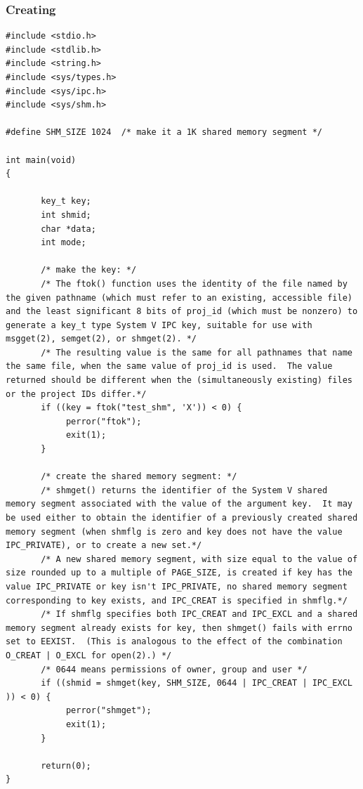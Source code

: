 \documentclass[12pt]{article}
\begin{document}
\subsubsection{Creating}
\begin{lstlisting}
#include <stdio.h>
#include <stdlib.h>
#include <string.h>
#include <sys/types.h>
#include <sys/ipc.h>
#include <sys/shm.h>

#define SHM_SIZE 1024  /* make it a 1K shared memory segment */

int main(void)
{

       key_t key;
       int shmid;
       char *data;
       int mode;

       /* make the key: */
       /* The ftok() function uses the identity of the file named by the given pathname (which must refer to an existing, accessible file) and the least significant 8 bits of proj_id (which must be nonzero) to generate a key_t type System V IPC key, suitable for use with msgget(2), semget(2), or shmget(2). */
       /* The resulting value is the same for all pathnames that name the same file, when the same value of proj_id is used.  The value returned should be different when the (simultaneously existing) files or the project IDs differ.*/
       if ((key = ftok("test_shm", 'X')) < 0) {
            perror("ftok");
            exit(1);
       }

       /* create the shared memory segment: */
       /* shmget() returns the identifier of the System V shared memory segment associated with the value of the argument key.  It may be used either to obtain the identifier of a previously created shared memory segment (when shmflg is zero and key does not have the value IPC_PRIVATE), or to create a new set.*/
       /* A new shared memory segment, with size equal to the value of size rounded up to a multiple of PAGE_SIZE, is created if key has the value IPC_PRIVATE or key isn't IPC_PRIVATE, no shared memory segment corresponding to key exists, and IPC_CREAT is specified in shmflg.*/
       /* If shmflg specifies both IPC_CREAT and IPC_EXCL and a shared memory segment already exists for key, then shmget() fails with errno set to EEXIST.  (This is analogous to the effect of the combination O_CREAT | O_EXCL for open(2).) */
       /* 0644 means permissions of owner, group and user */
       if ((shmid = shmget(key, SHM_SIZE, 0644 | IPC_CREAT | IPC_EXCL )) < 0) {
            perror("shmget");
            exit(1);
       }

       return(0);
}
\end{lstlisting}
\end{document}
